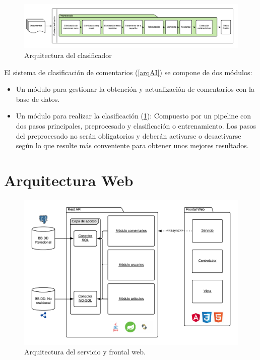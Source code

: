 \begin{figure}[H]
	\centering
	\includegraphics[width=1\textwidth]{imaxes/pipeclasif.png}
	\caption{Arquitectura del clasificador}
	\label{clasifPipe}
\end{figure}

El sistema de clasificación de comentarios (\ref{arqAI}) se compone de dos módulos:

\begin{itemize}
\item Un módulo para gestionar la obtención y actualización de comentarios con la base de datos.
\item Un módulo para realizar la clasificación (\ref{clasifPipe}): Compuesto por un pipeline con dos pasos principales, preprocesado y clasificación o entrenamiento. Los pasos del preprocesado no serán obligatorios y deberán activarse o desactivarse según lo que resulte más conveniente para obtener unos mejores resultados.
\end{itemize}

\section{Arquitectura Web}

\begin{figure}[H]
	\centering
	\includegraphics[width=1\textwidth]{imaxes/arqServ.png}
	\caption{Arquitectura del servicio y frontal web.}
	\label{arqServ}
\end{figure}

